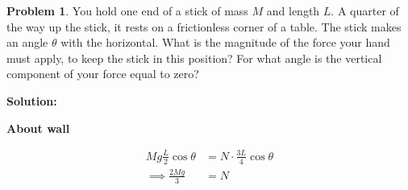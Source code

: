 \documentclass{article}
\theoremstyle{definition}
\newtheorem{problem}{Problem}
\newenvironment{solution}
  {\par\vspace{0.5em}\noindent\textbf{Solution:}\par\nopagebreak\vspace{0.3em}}
  {\par\vspace{1em}}
\begin{document}
\begin{problem}
    You hold one end of a stick of mass $M$ and length $L$. A quarter of the way up the stick, it rests on a frictionless corner of a table. The stick makes an angle $\theta$ with the horizontal. What is the magnitude of the force your hand must apply, to keep the stick in this position? For what angle is the vertical component of your force equal to zero?
\end{problem}
\begin{solution}
    \begin{minipage}[t]{0.42\textwidth}
    \vspace{0pt}
    \end{minipage}%
    \hfill
    \begin{minipage}[t]{0.55\textwidth}
    \vspace{0pt}
    \textbf{About wall}
    
    \begin{align*}
    Mg \frac{L}{2} \cos\theta &= N \cdot \frac{3L}{4} \cos\theta \\[6pt]
    \implies \frac{2Mg}{3} &= N
    \end{align*}
    
    \end{minipage}
\end{solution}
\end{document}
